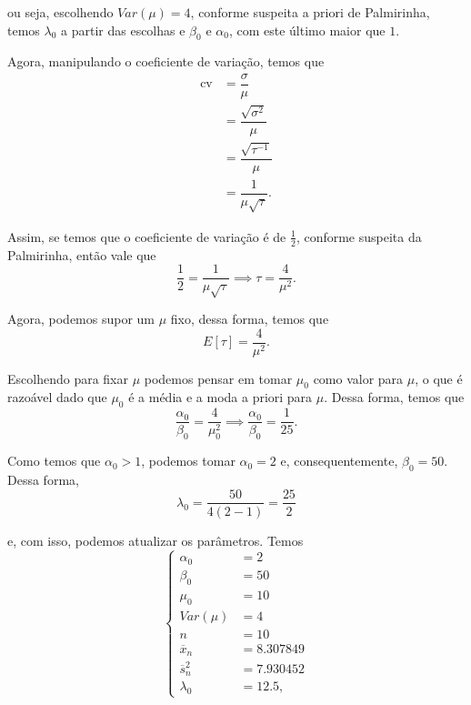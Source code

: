 \documentclass{article}
\begin{document}
\noindent ou seja, escolhendo $Var(\mu) = 4$, conforme suspeita a priori de Palmirinha, temos $\lambda_0$ a partir das escolhas e $\beta_0$ e $\alpha_0$, com este último maior que $1$.

Agora, manipulando o coeficiente de variação, temos que
\begin{equation*}
    \begin{split}
        \operatorname{cv} & = \dfrac{\sigma}{\mu} \\
        & = \dfrac{\sqrt{\sigma^2}}{\mu} \\
        & = \dfrac{\sqrt{\tau^{-1}}}{\mu} \\
        & = \dfrac{1}{\mu \sqrt{\tau}}.
    \end{split}
\end{equation*}

Assim, se temos que o coeficiente de variação é de $\frac{1}{2}$, conforme suspeita da Palmirinha, então vale que
\[\dfrac{1}{2} = \dfrac{1}{\mu \sqrt{\tau}} \implies \tau = \dfrac{4}{\mu^2}.\]

Agora, podemos supor um $\mu$ fixo, dessa forma, temos que
\[E[\tau] = \dfrac{4}{\mu^2}.\]

Escolhendo para fixar $\mu$ podemos pensar em tomar $\mu_0$ como valor para $\mu$, o que é razoável dado que $\mu_0$ é a média e a moda a priori para $\mu$. Dessa forma, temos que
\[\dfrac{\alpha_0}{\beta_0} = \dfrac{4}{\mu_0^2} \implies \dfrac{\alpha_0}{\beta_0} = \dfrac{1}{25}.\]

Como temos que $\alpha_0 > 1$, podemos tomar $\alpha_0 = 2$ e, consequentemente, $\beta_0 = 50$. Dessa forma,
\[\lambda_0 = \dfrac{50}{4 \left(2 - 1\right)} = \dfrac{25}{2}\]

\noindent e, com isso, podemos atualizar os parâmetros. Temos
\begin{equation*}
    \left\{
        \begin{array}{ll}
            \alpha_0 & = 2 \\
            \beta_0 & = 50 \\
            \mu_0 & = 10 \\
            Var(\mu) & = 4 \\
            n & = 10 \\
            \overline{x}_n & = 8.307849 \\
            \overline{s}_n^2 & = 7.930452 \\
            \lambda_0 & = 12.5,
        \end{array}
    \right.
\end{equation*}
\end{document}

